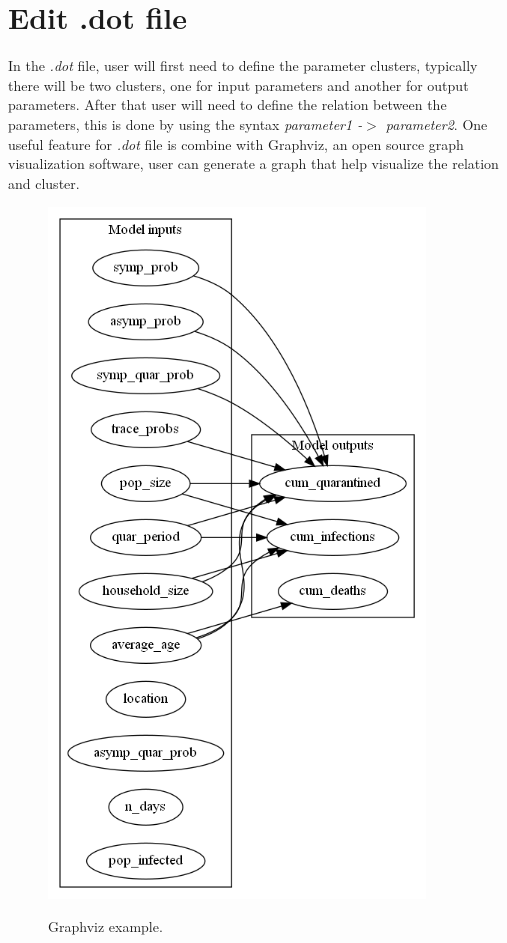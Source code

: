 \section{Edit .dot file}
In the \textsl{.dot} file, user will first need to define the parameter clusters, typically there will be two clusters, one for input parameters and another for output parameters. After that user will need to define the relation between the parameters, this is done by using the syntax \textsl{ parameter1 -$>$ parameter2}. One useful feature for \textsl{.dot} file is combine with Graphviz, an open source graph visualization software, user can generate a graph that help visualize the relation and cluster. 
\begin{figure}[H]
	\centering
	\includegraphics[width=10cm]{figures/dotExample.png}\\
	\caption{Graphviz example.}
	\label{fig:figure13}
\end{figure}

